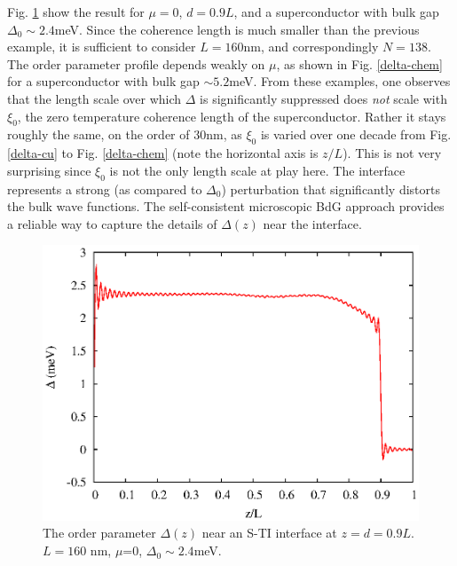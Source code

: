 Fig. \ref{delta-24} show the result for $\mu=0$, $d=0.9L$, and 
a superconductor with bulk gap $\Delta_0\sim 2.4$meV. Since the coherence length
is much smaller than the previous example, it is sufficient to consider 
$L=160$nm, and correspondingly $N=138$. 
The order parameter profile  
depends weakly on $\mu$, as shown in Fig. \ref{delta-chem} for a superconductor
with bulk gap $\sim 5.2$meV. 
From these examples, one observes that the length scale over which $\Delta$ is 
significantly suppressed does {\it not} scale with $\xi_0$, the zero temperature
coherence length of the superconductor. Rather it stays roughly the same, 
on the order of $30$nm, as $\xi_0$ is varied over one decade from Fig. \ref{delta-cu}
to Fig. \ref{delta-chem} (note the horizontal axis is $z/L$). 
This is not very surprising since $\xi_0$ is not the only length scale at play here.
The interface represents a strong (as compared to $\Delta_0$) perturbation that 
significantly distorts the bulk wave functions.
The self-consistent microscopic BdG approach provides a reliable way to
capture the details of $\Delta(z)$ near the interface.


\begin{figure}
\center
\includegraphics[width=\textwidth]{include/dt.eps}
\caption{The order parameter $\Delta(z)$ near an S-TI interface at $
z=d=0.9L$. $L=160$ nm, $\mu$=0, $\Delta_0\sim 2.4$meV.}
\label{delta-24}
\end{figure}


